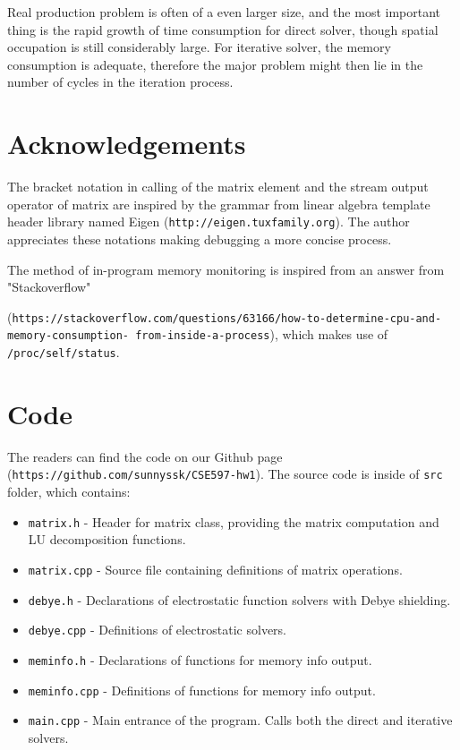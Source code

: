\documentclass{article}
\begin{document}
\begin{spacing}{1.1}
Real production problem is often of a even larger size, and the most important thing is the rapid growth of time consumption for direct solver, though spatial occupation is still considerably large. For iterative solver, the memory consumption is adequate, therefore the major problem might then lie in the number of cycles in the iteration process.


\newpage
\begin{appendices}

\section{Acknowledgements}

The bracket notation in calling of the matrix element and the stream output operator of matrix are inspired by the grammar from linear algebra template header library named Eigen (\texttt{http://eigen.tuxfamily.org}). The author appreciates these notations making debugging a more concise process.

The method of in-program memory monitoring is inspired from an answer from "Stackoverflow"

(\texttt{https://stackoverflow.com/questions/63166/how-to-determine-cpu-and-memory-consumption-
from-inside-a-process}), which makes use of \texttt{/proc/self/status}.

\section{Code}

The readers can find the code on our Github page (\texttt{https://github.com/sunnyssk/CSE597-hw1}). The source code is inside of \texttt{src} folder, which contains:

\begin{itemize}
    \item \texttt{matrix.h} - Header for matrix class, providing the matrix computation and LU decomposition functions.
    \item \texttt{matrix.cpp} - Source file containing definitions of matrix operations.
    \item \texttt{debye.h} - Declarations of electrostatic function solvers with Debye shielding.
    \item \texttt{debye.cpp} - Definitions of electrostatic solvers.
    \item \texttt{meminfo.h} - Declarations of functions for memory info output.
    \item \texttt{meminfo.cpp} - Definitions of functions for memory info output.
    \item \texttt{main.cpp} - Main entrance of the program. Calls both the direct and iterative solvers.
\end{itemize}


\end{appendices}
\end{spacing}
\end{document}
